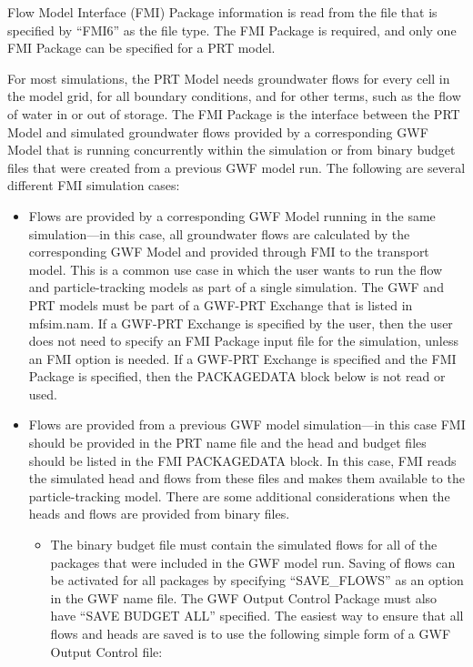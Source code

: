 Flow Model Interface (FMI) Package information is read from the file that is specified by ``FMI6'' as the file type.  The FMI Package is required, and only one FMI Package can be specified for a PRT model.

For most simulations, the PRT Model needs groundwater flows for every cell in the model grid, for all boundary conditions, and for other terms, such as the flow of water in or out of storage.  The FMI Package is the interface between the PRT Model and simulated groundwater flows provided by a corresponding GWF Model that is running concurrently within the simulation or from binary budget files that were created from a previous GWF model run.  The following are several different FMI simulation cases:

\begin{itemize}

\item Flows are provided by a corresponding GWF Model running in the same simulation---in this case, all groundwater flows are calculated by the corresponding GWF Model and provided through FMI to the transport model.  This is a common use case in which the user wants to run the flow and particle-tracking models as part of a single simulation.  The GWF and PRT models must be part of a GWF-PRT Exchange that is listed in mfsim.nam.  If a GWF-PRT Exchange is specified by the user, then the user does not need to specify an FMI Package input file for the simulation, unless an FMI option is needed.  If a GWF-PRT Exchange is specified and the FMI Package is specified, then the PACKAGEDATA block below is not read or used.

\item Flows are provided from a previous GWF model simulation---in this case FMI should be provided in the PRT name file and the head and budget files should be listed in the FMI PACKAGEDATA block.  In this case, FMI reads the simulated head and flows from these files and makes them available to the particle-tracking model.  There are some additional considerations when the heads and flows are provided from binary files.

\begin{itemize}
\item The binary budget file must contain the simulated flows for all of the packages that were included in the GWF model run.  Saving of flows can be activated for all packages by specifying ``SAVE\_FLOWS'' as an option in the GWF name file.  The GWF Output Control Package must also have ``SAVE BUDGET ALL'' specified.  The easiest way to ensure that all flows and heads are saved is to use the following simple form of a GWF Output Control file:


\end{itemize}
\end{itemize}
